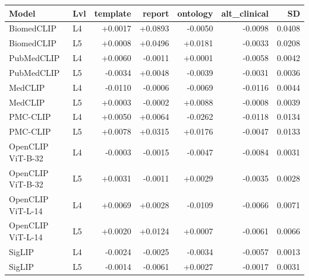 \begin{tabular}{llrrrrr}
\toprule
Model & Lvl & template & report & ontology & alt_clinical & SD \\
\midrule
BiomedCLIP & L4 & +0.0017 & +0.0893 & -0.0050 & -0.0098 & 0.0408 \\
BiomedCLIP & L5 & +0.0008 & +0.0496 & +0.0181 & -0.0033 & 0.0208 \\
PubMedCLIP & L4 & +0.0060 & -0.0011 & +0.0001 & -0.0058 & 0.0042 \\
PubMedCLIP & L5 & -0.0034 & +0.0048 & -0.0039 & -0.0031 & 0.0036 \\
MedCLIP & L4 & -0.0110 & -0.0006 & -0.0069 & -0.0116 & 0.0044 \\
MedCLIP & L5 & +0.0003 & -0.0002 & +0.0088 & -0.0008 & 0.0039 \\
PMC-CLIP & L4 & +0.0050 & +0.0064 & -0.0262 & -0.0118 & 0.0134 \\
PMC-CLIP & L5 & +0.0078 & +0.0315 & +0.0176 & -0.0047 & 0.0133 \\
OpenCLIP ViT-B-32 & L4 & -0.0003 & -0.0015 & -0.0047 & -0.0084 & 0.0031 \\
OpenCLIP ViT-B-32 & L5 & +0.0031 & -0.0011 & +0.0029 & -0.0035 & 0.0028 \\
OpenCLIP ViT-L-14 & L4 & +0.0069 & +0.0028 & -0.0109 & -0.0066 & 0.0071 \\
OpenCLIP ViT-L-14 & L5 & +0.0020 & +0.0124 & +0.0007 & -0.0061 & 0.0066 \\
SigLIP & L4 & -0.0024 & -0.0025 & -0.0034 & -0.0057 & 0.0013 \\
SigLIP & L5 & -0.0014 & -0.0061 & +0.0027 & -0.0017 & 0.0031 \\
\bottomrule
\end{tabular}
